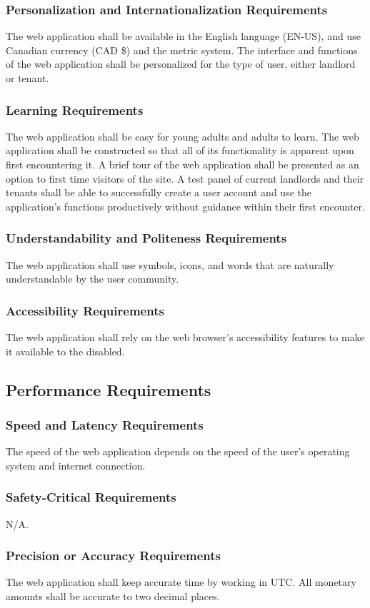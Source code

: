 \documentclass[12pt, titlepage]{article}
\begin{document}
{\subsubsection{Personalization and Internationalization Requirements}
The web application shall be available in the English language (EN-US), and use Canadian currency (CAD \$) and the metric system. The interface and functions of the web application shall be personalized for the type of user, either landlord or tenant.
\subsubsection{Learning Requirements}
The web application shall be easy for young adults and adults to learn. The web application shall be constructed so that all of its functionality is apparent upon first encountering it. A brief tour of the web application shall be presented as an option to first time visitors of the site. A test panel of current landlords and their tenants shall be able to successfully create a user account and use the application's functions productively without guidance within their first encounter.
\subsubsection{Understandability and Politeness Requirements}
The web application shall use symbols, icons, and words that are naturally understandable by the user community. 
\subsubsection{Accessibility Requirements}
The web application shall rely on the web browser's accessibility features to make it available to the disabled.
\subsection{Performance Requirements}
\subsubsection{Speed and Latency Requirements}
The speed of the web application depends on the speed of the user's operating system and internet connection.
\subsubsection{Safety-Critical Requirements}
N/A.
\subsubsection{Precision or Accuracy Requirements}
The web application shall keep accurate time by working in UTC. All monetary amounts shall be accurate to two decimal places. 
}
\end{document}
